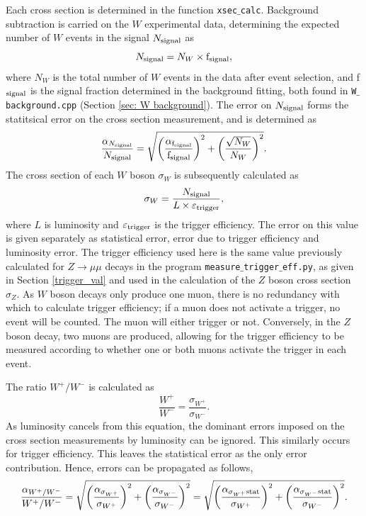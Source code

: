 \documentclass[a4paper]{article}
\begin{document}
Each cross section is determined in the function \texttt{xsec$\_$calc}. Background subtraction is carried on the $W$ experimental data, determining the expected number of $W$ events in the signal $N_{\rm signal}$ as
\begin{equation}
    N_{\rm signal} = N_W \times {\rm f}_{\rm signal},
\end{equation}
where $N_W$ is the total number of $W$ events in the data after event selection, and f$_{\rm signal}$ is the signal fraction determined in the background fitting, both found in \texttt{W$\_$background.cpp} (Section \ref{sec: W background}). The error on $N_{\rm signal}$ forms the statitsical error on the cross section measurement, and is determined as
\begin{equation}
    \frac{\alpha_{N_{\rm signal}}}{N_{\rm signal}} = \sqrt{\left(\frac{\alpha_{{\rm f}_{\rm signal}}}{{\rm f}_{\rm signal}}\right)^2 + \left(\frac{\sqrt{N_W}}{N_W}\right)^2} .
\end{equation}
The cross section of each $W$ boson $\sigma_W$ is subsequently calculated as
\begin{equation}
    \sigma_W = \frac{N_{\rm signal}}{L \times \varepsilon_{\rm trigger}},
\end{equation}
where $L$ is luminosity and $\varepsilon_{\rm trigger}$ is the trigger efficiency. The error on this value is given separately as statistical error, error due to trigger efficiency and luminosity error.
The trigger efficiency used here is the same value previously calculated for $Z\xrightarrow{}\mu\mu$ decays in the program \texttt{measure$\_$trigger$\_$eff.py}, as given in Section \ref{trigger_val} and used in the calculation of the $Z$ boson cross section $\sigma_Z$. 
As $W$ boson decays only produce one muon, there is no redundancy with which to calculate trigger efficiency; if a muon does not activate a trigger, no event will be counted. The muon will either trigger or not. Conversely, in the $Z$ boson decay, two muons are produced, allowing for the trigger efficiency to be measured according to whether one or both muons activate the trigger in each event.

The ratio $W^+/W^-$ is calculated as 
\begin{equation}
    \frac{W^+}{W^-} = \frac{\sigma_{W^+}}{\sigma_{W^-}}.    
\end{equation}
As luminosity cancels from this equation, the dominant errors imposed on the cross section measurements by luminosity can be ignored. This similarly occurs for trigger efficiency. 
This leaves the statistical error as the only error contribution.
Hence, errors can be propagated as follows,
\begin{equation}
    \frac{\alpha_{W^+/W^-}}{W^+/W^-} = \sqrt{\left(\frac{\alpha_{\sigma_{W^+}}}{\sigma_{W^+}}\right)^2 + \left(\frac{\alpha_{\sigma_{W^-}}}{\sigma_{W^-}}\right)^2} = \sqrt{\left(\frac{\alpha_{\sigma_{W^+} \rm stat}}{\sigma_{W^+}}\right)^2 + \left(\frac{\alpha_{\sigma_{W^-} \rm stat}}{\sigma_{W^-}}\right)^2}.
\end{equation}
\end{document}
